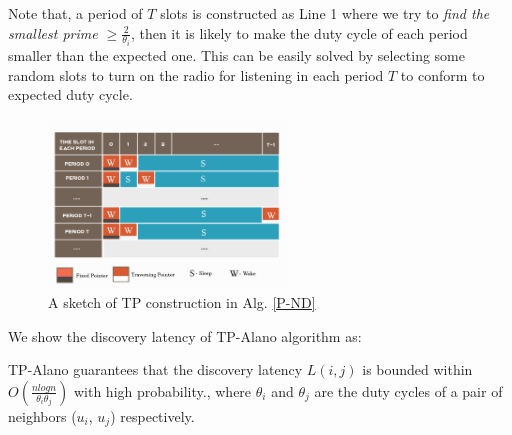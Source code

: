Note that, a period of $T$ slots is constructed as Line 1 where we try to \emph{find the smallest prime $\geq \frac{2}{\theta_i}$},
then it is likely to make the duty cycle of each period smaller than the expected one. This can be easily solved by selecting some random slots to turn on the radio for listening in each period $T$ to conform to expected duty cycle.


\begin{figure}[!h]
\centering
\includegraphics[width=2.5in]{./Figure/TP}
\caption{A sketch of TP construction in Alg. \ref{P-ND}}
\label{TP}
\end{figure}

We show the discovery latency of TP-Alano algorithm as:


\begin{theorem}
\label{PBND1}
TP-Alano guarantees that the discovery latency $L(i,j)$
is bounded within $O(\frac{nlogn}{\theta_i\theta_j})$ with high probability.,
where $\theta_i$ and $\theta_j$ are the duty cycles of
a pair of neighbors ($u_i$, $u_j$) respectively.
\end{theorem}



